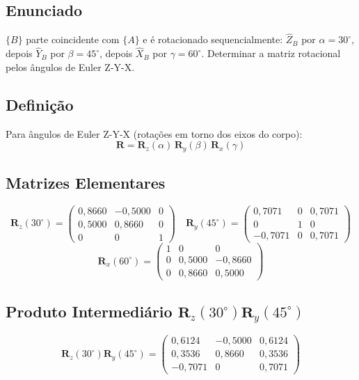 \documentclass[12pt,a4paper]{article}
\newcommand{\Rx}[1]{\mathbf{R}_x(#1)}
\newcommand{\Ry}[1]{\mathbf{R}_y(#1)}
\newcommand{\Rz}[1]{\mathbf{R}_z(#1)}
\newcommand{\degr}{^{\circ}}
\begin{document}
\subsection*{Enunciado}
$\{B\}$ parte coincidente com $\{A\}$ e é rotacionado sequencialmente:
$\hat{Z}_B$ por $\alpha=30\degr$, depois $\hat{Y}_B$ por $\beta=45\degr$, depois $\hat{X}_B$ por $\gamma=60\degr$.
Determinar a matriz rotacional pelos ângulos de Euler Z-Y-X.

\subsection{Definição}

Para ângulos de Euler Z-Y-X (rotações em torno dos eixos do corpo):
\[
  \mathbf{R} = \Rz{\alpha}\,\Ry{\beta}\,\Rx{\gamma}
\]

\subsection{Matrizes Elementares}

\[
\Rz{30\degr} =
\begin{pmatrix} 0{,}8660 & -0{,}5000 & 0 \\ 0{,}5000 & 0{,}8660 & 0 \\ 0 & 0 & 1 \end{pmatrix}
\quad
\Ry{45\degr} =
\begin{pmatrix} 0{,}7071 & 0 & 0{,}7071 \\ 0 & 1 & 0 \\ -0{,}7071 & 0 & 0{,}7071 \end{pmatrix}
\]
\[
\Rx{60\degr} =
\begin{pmatrix} 1 & 0 & 0 \\ 0 & 0{,}5000 & -0{,}8660 \\ 0 & 0{,}8660 & 0{,}5000 \end{pmatrix}
\]

\subsection{Produto Intermediário $\Rz{30\degr}\Ry{45\degr}$}

\[
\Rz{30\degr}\Ry{45\degr} =
\begin{pmatrix}
  0{,}6124 & -0{,}5000 & 0{,}6124 \\
  0{,}3536 &  0{,}8660 & 0{,}3536 \\
 -0{,}7071 &  0        & 0{,}7071
\end{pmatrix}
\]
\end{document}
